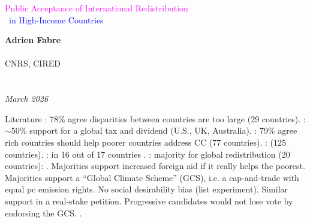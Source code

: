 \documentclass[aspectratio=169,xcolor=dvipsnames, 11pt,mathserif]{beamer}
\begin{document}

\begin{frame}
\thispagestyle{empty}
\begin{center}
\begin{LARGE}
\textcolor{magenta}{Public Acceptance of International Redistribution}\\~\textcolor{blue}{in High-Income Countries} \end{LARGE}
\vspace{1cm}


\textbf{Adrien Fabre} \\ \quad \\
CNRS, CIRED \\ \quad \\ \quad \\
\textit{March 2026} 
\end{center}
\bigskip
\end{frame}


\begin{frame}{Literature\label{literature}}
\bbvsp
\ip {}: 78\% agree disparities between countries are too large (29 countries).
\ip {}: $\sim$50\% support for a global tax and dividend (U.S., UK, Australia).
\ip {}: 79\% agree rich countries should help poorer countries address CC (77 countries).
\ip {}:  (125 countries).
\ip {}:  in 16 out of 17 countries .
\ip {}:  majority  for global redistribution (20 countries):
\bbvsp \ip {}.
\ip Majorities support increased foreign aid if it really helps the poorest.
\ip Majorities support a ``Global Climate Scheme'' (GCS), i.e. a cap-and-trade with equal pc emission rights.
\ip No social desirability bias (list experiment). Similar support in a real-stake petition.
\ip Progressive candidates would not lose vote by endorsing the GCS.
\ip {}.
\ee \ee
\end{frame}
\end{document}
